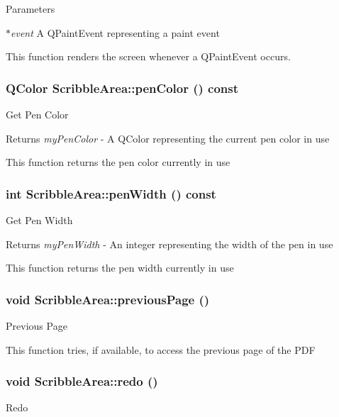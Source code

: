 \begin{DoxyParams}{Parameters}
\item[{\em $\ast$event}]A QPaintEvent representing a paint event\end{DoxyParams}
This function renders the screen whenever a QPaintEvent occurs. \hypertarget{classScribbleArea_a1de2530671bd6d575a1499892e877990}{
\subsubsection[{penColor}]{\setlength{\rightskip}{0pt plus 5cm}QColor ScribbleArea::penColor () const}}
\label{classScribbleArea_a1de2530671bd6d575a1499892e877990}
Get Pen Color

\begin{DoxyReturn}{Returns}
{\itshape myPenColor\/} -\/ A QColor representing the current pen color in use
\end{DoxyReturn}
This function returns the pen color currently in use \hypertarget{classScribbleArea_a2d1b263e57b70bf645934a1ac2f4e29f}{
\subsubsection[{penWidth}]{\setlength{\rightskip}{0pt plus 5cm}int ScribbleArea::penWidth () const}}
\label{classScribbleArea_a2d1b263e57b70bf645934a1ac2f4e29f}
Get Pen Width

\begin{DoxyReturn}{Returns}
{\itshape myPenWidth\/} -\/ An integer representing the width of the pen in use
\end{DoxyReturn}
This function returns the pen width currently in use \hypertarget{classScribbleArea_a750efd0b17aaab32304ef975d2fc9948}{
\subsubsection[{previousPage}]{\setlength{\rightskip}{0pt plus 5cm}void ScribbleArea::previousPage ()}}
\label{classScribbleArea_a750efd0b17aaab32304ef975d2fc9948}
Previous Page

This function tries, if available, to access the previous page of the PDF \hypertarget{classScribbleArea_a765af373a01bba4ddb8ff9cda8af7a10}{
\subsubsection[{redo}]{\setlength{\rightskip}{0pt plus 5cm}void ScribbleArea::redo ()}}
\label{classScribbleArea_a765af373a01bba4ddb8ff9cda8af7a10}
Redo

